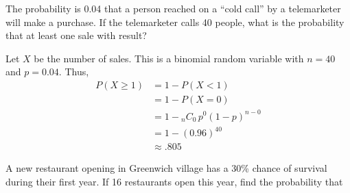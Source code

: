 \documentclass[answers,11pt]{exam}
\renewcommand{\binom}[2]{\ensuremath{{}_{#1}C_{#2}}\,}
\begin{document}
\begin{questions}


\newpage


\question The probability is 0.04 that a person reached on a ``cold call'' by a
telemarketer will make a purchase.  If the telemarketer calls 40 people, what
is the probability that at least one sale with result?

\begin{solution}
Let $X$ be the number of sales.  This is a binomial random variable with $n =
40$ and $p = 0.04$.  Thus,
\begin{align*}
  P(X \geq 1) &= 1 - P(X < 1) \\
    &= 1 - P(X = 0) \\
    &= 1 - \binom{n}{0} p^0 (1-p)^{n-0} \\
    &= 1 - (0.96)^{40} \\
    &\approx .805
\end{align*}
\end{solution}





\question A new restaurant opening in Greenwich village has a 30\% chance of
survival during their first year.  If 16 restaurants open this year, find the
probability that 

\end{questions}
\end{document}
